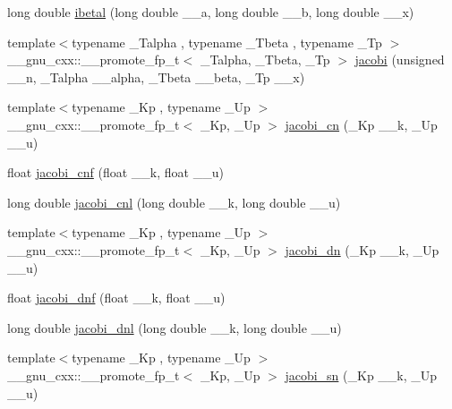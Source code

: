 \begin{DoxyCompactItemize}
\item 
long double \hyperlink{group__gnu__math__spec__func_ga5c9c5b583e4f1c9785a1c4582551c97f}{ibetal} (long double \+\_\+\+\_\+a, long double \+\_\+\+\_\+b, long double \+\_\+\+\_\+x)
\item 
{\footnotesize template$<$typename \+\_\+\+Talpha , typename \+\_\+\+Tbeta , typename \+\_\+\+Tp $>$ }\\\+\_\+\+\_\+gnu\+\_\+cxx\+::\+\_\+\+\_\+promote\+\_\+fp\+\_\+t$<$ \+\_\+\+Talpha, \+\_\+\+Tbeta, \+\_\+\+Tp $>$ \hyperlink{group__gnu__math__spec__func_ga3dea9ec3774ee5db50276597bbfb0afa}{jacobi} (unsigned \+\_\+\+\_\+n, \+\_\+\+Talpha \+\_\+\+\_\+alpha, \+\_\+\+Tbeta \+\_\+\+\_\+beta, \+\_\+\+Tp \+\_\+\+\_\+x)
\item 
{\footnotesize template$<$typename \+\_\+\+Kp , typename \+\_\+\+Up $>$ }\\\+\_\+\+\_\+gnu\+\_\+cxx\+::\+\_\+\+\_\+promote\+\_\+fp\+\_\+t$<$ \+\_\+\+Kp, \+\_\+\+Up $>$ \hyperlink{group__gnu__math__spec__func_ga51512996a910489b4554daa7507a48f1}{jacobi\+\_\+cn} (\+\_\+\+Kp \+\_\+\+\_\+k, \+\_\+\+Up \+\_\+\+\_\+u)
\item 
float \hyperlink{group__gnu__math__spec__func_gadbd6320123f45ae10d539cf8df0373cd}{jacobi\+\_\+cnf} (float \+\_\+\+\_\+k, float \+\_\+\+\_\+u)
\item 
long double \hyperlink{group__gnu__math__spec__func_ga08892965ea520116cc53a764513fe685}{jacobi\+\_\+cnl} (long double \+\_\+\+\_\+k, long double \+\_\+\+\_\+u)
\item 
{\footnotesize template$<$typename \+\_\+\+Kp , typename \+\_\+\+Up $>$ }\\\+\_\+\+\_\+gnu\+\_\+cxx\+::\+\_\+\+\_\+promote\+\_\+fp\+\_\+t$<$ \+\_\+\+Kp, \+\_\+\+Up $>$ \hyperlink{group__gnu__math__spec__func_ga4c2e5ff17abaab5217d4dbcbfd7366d8}{jacobi\+\_\+dn} (\+\_\+\+Kp \+\_\+\+\_\+k, \+\_\+\+Up \+\_\+\+\_\+u)
\item 
float \hyperlink{group__gnu__math__spec__func_gae96327d678adc6b5c4051f1c3649549a}{jacobi\+\_\+dnf} (float \+\_\+\+\_\+k, float \+\_\+\+\_\+u)
\item 
long double \hyperlink{group__gnu__math__spec__func_gae59786991abbf8359deef49b6323065a}{jacobi\+\_\+dnl} (long double \+\_\+\+\_\+k, long double \+\_\+\+\_\+u)
\item 
{\footnotesize template$<$typename \+\_\+\+Kp , typename \+\_\+\+Up $>$ }\\\+\_\+\+\_\+gnu\+\_\+cxx\+::\+\_\+\+\_\+promote\+\_\+fp\+\_\+t$<$ \+\_\+\+Kp, \+\_\+\+Up $>$ \hyperlink{group__gnu__math__spec__func_ga5e39ec723669e132e27980dfdf766c19}{jacobi\+\_\+sn} (\+\_\+\+Kp \+\_\+\+\_\+k, \+\_\+\+Up \+\_\+\+\_\+u)

\end{DoxyCompactItemize}
